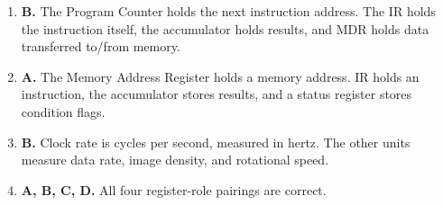 \begin{enumerate}[label=\textbf{Q\arabic*.}, leftmargin=*]
\item \textbf{B.} The Program Counter holds the next instruction address. The IR holds the instruction itself, the accumulator holds results, and MDR holds data transferred to/from memory.

\item \textbf{A.} The Memory Address Register holds a memory address. IR holds an instruction, the accumulator stores results, and a status register stores condition flags.

\item \textbf{B.} Clock rate is cycles per second, measured in hertz. The other units measure data rate, image density, and rotational speed.

\item \textbf{A, B, C, D.} All four register-role pairings are correct.

\end{enumerate}

